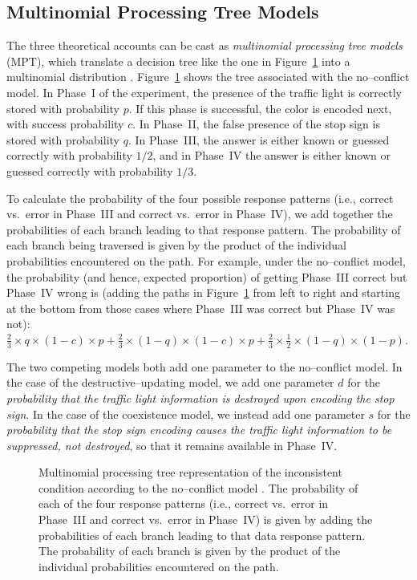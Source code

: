 \subsection{Multinomial Processing Tree Models}
The three theoretical accounts can be cast as \emph{multinomial processing tree models} (MPT), which translate a decision tree like the one in Figure~\ref{fig:bi3:noconf} into a multinomial distribution \cite{BatchelderRiefer1980, Chechile1973, riefer1988multinomial}. Figure~\ref{fig:bi3:noconf} shows the tree associated with the no--conflict model. In Phase~I of the experiment, the presence of the traffic light is correctly stored with probability $p$. If this phase is successful, the color is encoded next, with success probability $c$. In Phase~II, the false presence of the stop sign is stored with probability $q$. In Phase~III, the answer is either known or guessed correctly with probability $1/2$, and in Phase~IV the answer is either known or guessed correctly with probability $1/3$.

To calculate the probability of the four possible response patterns (i.e., correct vs.\ error in Phase~III and correct vs.\ error in Phase~IV), we add together the probabilities of each branch leading to that response pattern. The probability of each branch being traversed is given by the product of the individual probabilities encountered on the path. For example, under the no--conflict model, the probability (and hence, expected proportion) of getting Phase~III correct but Phase~IV wrong is (adding the paths in Figure~\ref{fig:bi3:noconf} from left to right and starting at the bottom from those cases where Phase~III was correct but Phase~IV was not): $\frac{2}{3} \times q \times (1-c) \times p + \frac{2}{3} \times (1-q) \times (1-c) \times p + \frac{2}{3} \times \frac{1}{2} \times (1-q) \times (1-p)$.

The two competing models both add one parameter to the no--conflict model. In the case of the destructive--updating model, we add one parameter $d$ for the \emph{probability that the traffic light information is destroyed upon encoding the stop sign}. In the case of the coexistence model, we instead add one parameter $s$ for the \emph{probability that the stop sign encoding causes the traffic light information to be suppressed, not destroyed}, so that it remains available in Phase~IV.

\begin{figure}[tb]
\begin{center}

\end{center}
\caption{ Multinomial processing tree representation of the inconsistent condition according to the no--conflict model {\protect\cite<adapted from>{WagenaarBoer1987}}. {The probability of each of the four response patterns (i.e., correct vs.\ error in Phase~III and correct vs.\ error in Phase~IV) is given by adding the probabilities of each branch leading to that data response pattern. The probability of each branch is given by the product of the individual probabilities encountered on the path.}} \label{fig:bi3:noconf}
\end{figure}

